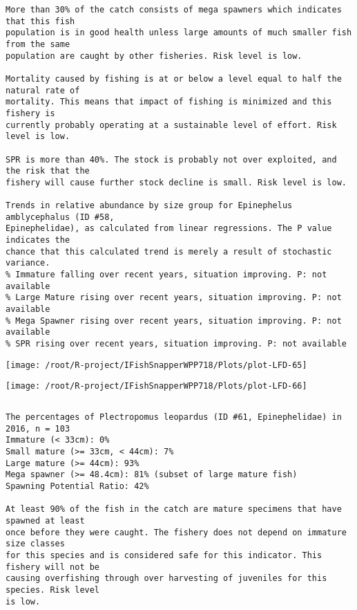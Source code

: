\documentclass{report}\usepackage[]{graphicx}\usepackage[]{color}
\makeatletter
\def\maxwidth{ %
  \ifdim\Gin@nat@width>\linewidth
    \linewidth
  \else
    \Gin@nat@width
  \fi
}
\newenvironment{kframe}{%
 \def\at@end@of@kframe{}%
 \ifinner\ifhmode%
  \def\at@end@of@kframe{\end{minipage}}%
  \begin{minipage}{\columnwidth}%
 \fi\fi%
 \def\FrameCommand##1{\hskip\@totalleftmargin \hskip-\fboxsep
 \colorbox{shadecolor}{##1}\hskip-\fboxsep
     \hskip-\linewidth \hskip-\@totalleftmargin \hskip\columnwidth}%
 \MakeFramed {\advance\hsize-\width
   \@totalleftmargin\z@ \linewidth\hsize
   \@setminipage}}%
 {\par\unskip\endMakeFramed%
 \at@end@of@kframe}
\newenvironment{knitrout}{}{} %
\makeatother
\begin{document}
\begin{knitrout}
\begin{kframe}
\begin{verbatim}
More than 30% of the catch consists of mega spawners which indicates that this fish
population is in good health unless large amounts of much smaller fish from the same
population are caught by other fisheries. Risk level is low.
 
Mortality caused by fishing is at or below a level equal to half the natural rate of
mortality. This means that impact of fishing is minimized and this fishery is
currently probably operating at a sustainable level of effort. Risk level is low.
 
SPR is more than 40%. The stock is probably not over exploited, and the risk that the
fishery will cause further stock decline is small. Risk level is low.
 
Trends in relative abundance by size group for Epinephelus amblycephalus (ID #58,
Epinephelidae), as calculated from linear regressions. The P value indicates the
chance that this calculated trend is merely a result of stochastic variance.
% Immature falling over recent years, situation improving. P: not available
% Large Mature rising over recent years, situation improving. P: not available
% Mega Spawner rising over recent years, situation improving. P: not available
% SPR rising over recent years, situation improving. P: not available
\end{verbatim}
\end{kframe}
\texttt{[image: /root/R-project/IFishSnapperWPP718/Plots/plot-LFD-65]} 

\texttt{[image: /root/R-project/IFishSnapperWPP718/Plots/plot-LFD-66]} 
\begin{kframe}\begin{verbatim}
\end{verbatim}
\end{kframe}
\clearpage
\newpage
\begin{kframe}\begin{verbatim}The percentages of Plectropomus leopardus (ID #61, Epinephelidae) in 2016, n = 103
Immature (< 33cm): 0%
Small mature (>= 33cm, < 44cm): 7%
Large mature (>= 44cm): 93%
Mega spawner (>= 48.4cm): 81% (subset of large mature fish)
Spawning Potential Ratio: 42%
 
At least 90% of the fish in the catch are mature specimens that have spawned at least
once before they were caught. The fishery does not depend on immature size classes
for this species and is considered safe for this indicator. This fishery will not be
causing overfishing through over harvesting of juveniles for this species. Risk level
is low.


\end{verbatim}
\end{kframe}
\end{knitrout}
\end{document}
